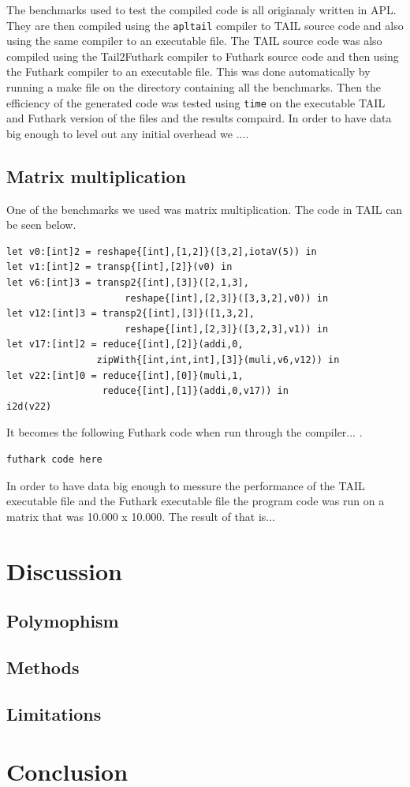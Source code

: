 \documentclass[11pt]{article}
\begin{document}
The benchmarks used to test the compiled code is all origianaly written in APL. They are then compiled using the {\tt apltail} compiler to TAIL source code and also using the same compiler to an executable file. The TAIL source code was also compiled using the Tail2Futhark compiler to Futhark source code and then using the Futhark compiler to an executable file. This was done automatically by running a make file on the directory containing all the benchmarks.
Then the efficiency of the generated code was tested using {\tt time} on the executable TAIL and Futhark version of the files and the results compaird. In order to have data big enough to level out any initial overhead we ....\\

\subsection{Matrix multiplication}

One of the benchmarks we used was matrix multiplication. The code in TAIL can be seen below. 

\begin{lstlisting}
let v0:[int]2 = reshape{[int],[1,2]}([3,2],iotaV(5)) in
let v1:[int]2 = transp{[int],[2]}(v0) in
let v6:[int]3 = transp2{[int],[3]}([2,1,3],
                     reshape{[int],[2,3]}([3,3,2],v0)) in
let v12:[int]3 = transp2{[int],[3]}([1,3,2],
                     reshape{[int],[2,3]}([3,2,3],v1)) in
let v17:[int]2 = reduce{[int],[2]}(addi,0,
                zipWith{[int,int,int],[3]}(muli,v6,v12)) in
let v22:[int]0 = reduce{[int],[0]}(muli,1,
                 reduce{[int],[1]}(addi,0,v17)) in
i2d(v22)
\end{lstlisting}

It becomes the following Futhark code when run through the compiler...
.
\begin{lstlisting}
futhark code here
\end{lstlisting}

In order to have data big enough to messure the performance of the TAIL executable file and the Futhark executable file the program code was run on a matrix that was 10.000 x 10.000. 
The result of that is...

\section{Discussion}

\subsection{Polymophism}
\subsection{Methods}
\subsection{Limitations}

\section{Conclusion}


{} 

\end{document}
